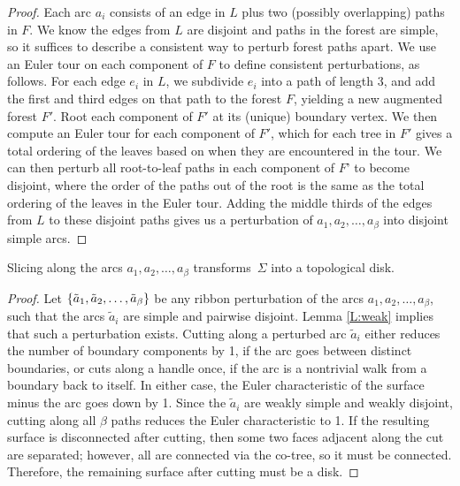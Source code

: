 \documentclass[letterpaper,review]{siamart190516}
\def\enote#1{\textcolor{magenta}{Erin: #1}}
\begin{document}
\begin{proof} 
Each arc $a_i$ consists of an edge in $L$ plus two (possibly overlapping) paths in $F$.  We know the edges from $L$ are disjoint and paths in the forest are simple, so it suffices to describe a consistent way to perturb forest paths apart.  
We use an Euler tour on each component of $F$ to define consistent perturbations, as follows.
For each edge $e_i$ in $L$, we subdivide $e_i$ into a path of length $3$, and add the first and third edges on that path to the forest $F$, yielding a new augmented forest $F'$.  Root each component of $F'$ at its (unique) boundary vertex.
We then compute an Euler tour for each component of $F'$, which for each tree in $F'$ gives a total ordering of the leaves based on when they are encountered in the tour.
We can then perturb all root-to-leaf paths in each component of $F’$ to become disjoint,  where the order of the paths out of the root is the same as the total ordering of the leaves in the Euler tour.
Adding the middle thirds of the edges from $L$ to these disjoint paths gives us a perturbation of $a_1, a_2, \dots, a_\beta$ into disjoint simple arcs.
\end{proof}

\begin{lemma}
\label{lem:disk}
Slicing along the arcs $a_1, a_2, \dots, a_\beta$ transforms~$\Sigma$ into a topological disk.
\end{lemma}

\begin{proof}
Let $\{ \tilde{a}_1, \tilde{a}_2, \dots, \tilde{a}_\beta \}$ be any ribbon perturbation of the arcs $a_1, a_2, \dots, a_\beta$, such that the arcs $\tilde{a}_i$ are simple and pairwise disjoint.  Lemma \ref{L:weak} implies that such a perturbation exists. Cutting along a perturbed arc $\tilde{a}_i$ either reduces the number of boundary components by 1, if the arc goes between distinct boundaries, or cuts along a handle once, if the arc is a nontrivial walk from a boundary back to itself.  In either case, the Euler characteristic of the surface minus the arc goes down by 1.  Since the $\tilde{a}_i$ are weakly simple and weakly disjoint, cutting along all $\beta$ paths reduces the Euler characteristic to 1.  If the resulting surface is disconnected after cutting, then some two faces adjacent along the cut are separated; however, all are connected via the co-tree, so it must be connected.  Therefore, the remaining surface after cutting must be a disk.  %

\end{proof}
\end{document}
